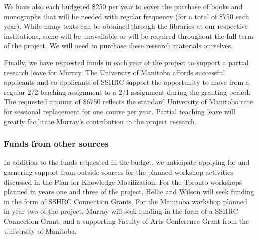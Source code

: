 \documentclass[12pt]{article}
\begin{document}
We have also each budgeted \$250 per year to cover the purchase of books and monographs
that will be needed with regular frequency (for a total of \$750 each year).
 While many texts can be obtained through the libraries at our respective
institutions, some will be unavailable or will be required throughout the full
term of the project. We will need to purchase these research materials
ourselves. 

Finally, we have requested funds in each year of the project to support a
partial research leave for Murray. The University of Manitoba affords
successful applicants and co-applicants of SSHRC support the opportunity to
move from a regular 2/2 teaching assignment to a 2/1 assignment during the
granting period. The requested amount of \$6750 reflects the standard
University of Manitoba rate for sessional replacement for one course per year.
Partial teaching leave will greatly facilitate Murray's contribution to the
project research. 
 

\subsubsection*{Funds from other sources}

In addition to the funds requested in the budget, we anticipate applying for
and garnering support from outside sources for the planned workshop activities
discussed in the Plan for Knowledge Mobilization.  For the Toronto workshops
planned in years one and three of the project, Hellie and Wilson will seek
funding in the form of SSHRC Connection Grants. For the Manitoba workshop
planned in year two of the project, Murray will seek funding in the form of a
SSHRC Connection Grant, and a supporting Faculty of Arts Conference Grant from
the University of Manitoba.  
\end{document}
